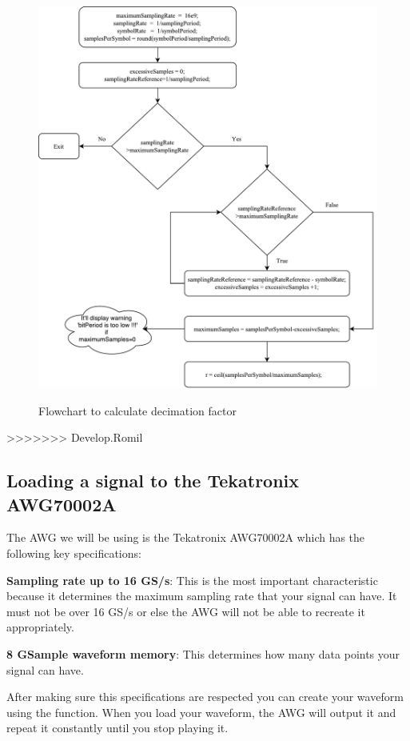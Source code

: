 \begin{figure}[h]
	\centering
	\includegraphics[scale = 0.60]{../mtools/sgnToWfm/figures/decimationFlochart.pdf}
	\label{decimation_Flowchart}\caption{Flowchart to calculate decimation factor}
\end{figure}
>>>>>>> Develop.Romil

\subsection{Loading a signal to the Tekatronix AWG70002A}

The AWG we will be using is the Tekatronix AWG70002A which has the following key specifications:
\bigskip

\textbf{Sampling rate up to 16 GS/s}: This is the most important characteristic  because it determines the maximum sampling rate that your signal can have. It must not be over 16 GS/s or else the AWG will not be able to recreate it appropriately.
\bigskip

\textbf{8 GSample waveform memory}: This determines how many data points your signal can have.
\bigskip

After making sure this specifications are respected you can create your waveform using the function. When you load your waveform, the AWG will output it and repeat it constantly until you stop playing it.
\bigskip

